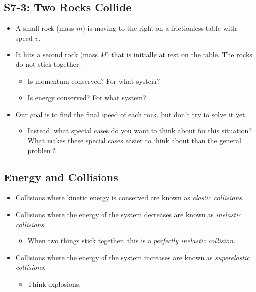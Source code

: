 \documentclass[]{article}
\begin{document}
\begin{PresentSpace}
\vspace{-10pt}
\section*{S7-3: Two Rocks Collide}
\vspace{-10pt}
\begin{itemize}
	\item A small rock (mass $m$) is moving to the right on a frictionless table with speed $v$.
	\item It hits a second rock (mass $M$) that is initially at rest on the table. The rocks do not stick together.
	\begin{itemize}
		\item Is momentum conserved? For what system?
		\item Is energy conserved? For what system?
	\end{itemize}
	\item Our goal is to find the final speed of each rock, but don't try to solve it yet.
	\begin{itemize}
		\item Instead, what special cases do you want to think about for this situation? What makes these special cases easier to think about than the general problem?
	\end{itemize}
\end{itemize}
\end{PresentSpace}
\newpage
\begin{TeacherMargin}

\end{TeacherMargin}
\begin{PresentSpace}
\vspace{-10pt}
\section*{Energy and Collisions}
\vspace{-10pt}
\begin{itemize}
	\item Collisions where kinetic energy is conserved are known as \textit{elastic collisions}.
	\item Collisions where the energy of the system decreases are known as \textit{inelastic collisions}.
	\begin{itemize}
		\item When two things stick together, this is a \textit{perfectly inelastic collision}.
	\end{itemize}
	\item Collisions where the energy of the system increases are known as \textit{superelastic collisions}.
	\begin{itemize}
		\item Think explosions.
	\end{itemize}
\end{itemize}
\end{PresentSpace}
\end{document}
